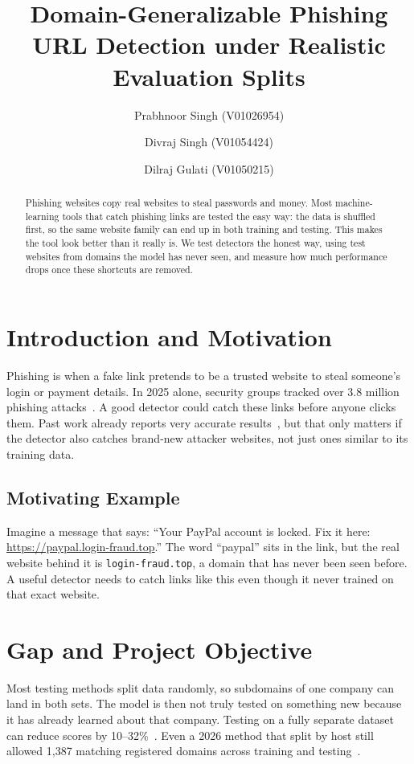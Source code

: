 \documentclass[sigconf,nonacm]{acmart}
\title{Domain-Generalizable Phishing URL Detection under Realistic Evaluation Splits}
\author{Prabhnoor Singh (V01026954)}
\affiliation{%
  \institution{University of Victoria}
  \city{Victoria}
  \country{Canada}}
\author{Divraj Singh (V01054424)}
\affiliation{%
  \institution{University of Victoria}
  \city{Victoria}
  \country{Canada}}
\author{Dilraj Gulati (V01050215)}
\affiliation{%
  \institution{University of Victoria}
  \city{Victoria}
  \country{Canada}}
\begin{document}
\begin{abstract}
Phishing websites copy real websites to steal passwords and money. Most machine-learning tools that catch phishing links are tested the easy way: the data is shuffled first, so the same website family can end up in both training and testing. This makes the tool look better than it really is. We test detectors the honest way, using test websites from domains the model has never seen, and measure how much performance drops once these shortcuts are removed.
\end{abstract}


\maketitle

\section{Introduction and Motivation}
Phishing is when a fake link pretends to be a trusted website to steal someone's login or payment details. In 2025 alone, security groups tracked over 3.8 million phishing attacks~\cite{apwg2026}. A good detector could catch these links before anyone clicks them. Past work already reports very accurate results~\cite{prasad2024}, but that only matters if the detector also catches brand-new attacker websites, not just ones similar to its training data.

\subsection{Motivating Example}
Imagine a message that says: ``Your PayPal account is locked. Fix it here: \url{https://paypal.login-fraud.top}.'' The word ``paypal'' sits in the link, but the real website behind it is \texttt{login-fraud.top}, a domain that has never been seen before. A useful detector needs to catch links like this even though it never trained on that exact website.

\section{Gap and Project Objective}
Most testing methods split data randomly, so subdomains of one company can land in both sets. The model is then not truly tested on something new because it has already learned about that company. Testing on a fully separate dataset can reduce scores by 10--32\%~\cite{rashid2024}. Even a 2026 method that split by host still allowed 1,387 matching registered domains across training and testing~\cite{ahamed2026}.
\end{document}
